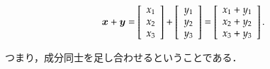                     \begin{align}
                        \boldsymbol{x} + \boldsymbol{y}
                        =
                        \left[
                            \begin{array}{c}
                                x_{1} \\
                                x_{2} \\
                                x_{3} \\
                            \end{array}
                        \right]
                        +
                        \left[
                            \begin{array}{c}
                                y_{1} \\
                                y_{2} \\
                                y_{3} \\
                            \end{array}
                        \right]
                        =
                        \left[
                            \begin{array}{c}
                                x_{1} + y_{1} \\
                                x_{2} + y_{2} \\
                                x_{3} + y_{3} \\
                            \end{array}
                        \right].
                    \end{align}

                    つまり，成分同士を足し合わせるということである．

